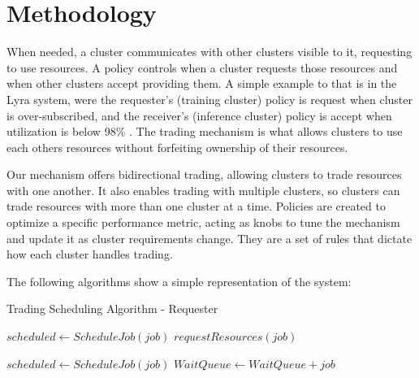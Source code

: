 \section{Methodology}
\vspace{1em}

\vspace{1em}
When needed, a cluster communicates with other clusters visible to it, requesting to use resources. A policy 
controls when a cluster requests those resources and when other clusters accept providing them. 
A simple example to that is in the Lyra system, were the requester's (training cluster) policy is request 
when cluster is over-subscribed, and the receiver's (inference cluster) policy is accept when 
utilization is below 98\% \cite{li_lyra_2023}. The trading mechanism is what allows clusters to use each others 
resources without forfeiting ownership of their resources. 

Our mechanism offers bidirectional trading, allowing clusters to trade resources with one another. It also 
enables trading with multiple clusters, so clusters can trade resources with more than one cluster at a time. 
Policies are created to optimize a specific performance metric, acting as knobs to 
tune the mechanism and update it as cluster requirements change. They are a set of rules that dictate how each 
cluster handles trading.

The following algorithms show a simple representation of the system: \label{example}

\begin{algorithm}[H]
\caption{Trading Scheduling Algorithm - Requester}
\begin{algorithmic}
        \State $scheduled \gets ScheduleJob(job)$
          
        \State $requestResources(job)$
        \EndIf
    \EndFor

        \State $scheduled \gets ScheduleJob(job)$
        \State $WaitQueue \gets WaitQueue + job$
        \EndIf
    \EndFor
\end{algorithmic}
\end{algorithm}

